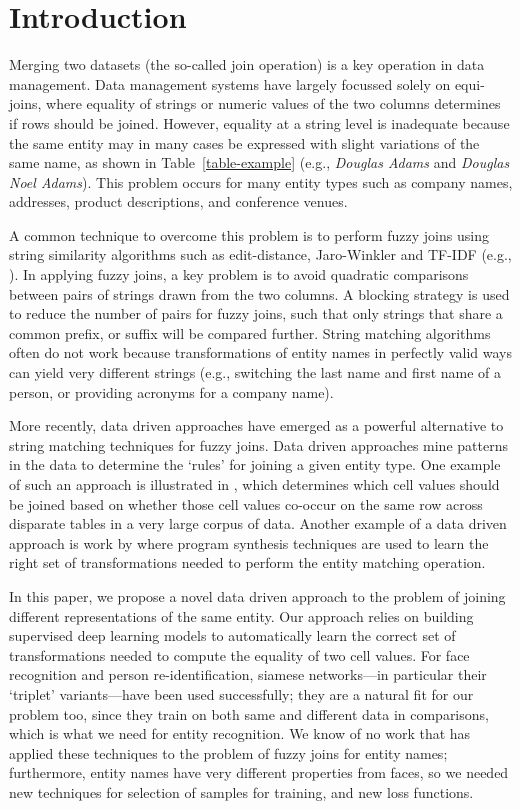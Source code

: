 \section{Introduction}

Merging two datasets (the so-called join operation) is a key operation in data management.  Data management systems have largely focussed solely on equi-joins, where equality of strings or numeric values of the two columns determines if rows should be joined.  However, equality at a string level is inadequate because the same entity may in many cases be expressed with slight variations of the same name, as shown in Table~\ref{table-example} (e.g., \textit{Douglas Adams} and \textit{Douglas Noel Adams}).  This problem occurs for many entity types such as company names, addresses, product descriptions, and conference venues.

A common technique to overcome this problem is to perform fuzzy joins using string similarity algorithms such as edit-distance, Jaro-Winkler and TF-IDF (e.g., \cite{Cohen2003}).  In applying fuzzy joins, a key problem is to avoid quadratic comparisons between pairs of strings drawn from the two columns.  A blocking strategy is used to reduce the number of pairs for fuzzy joins, such that only strings that share a common prefix, or suffix will be compared further.  String matching algorithms often do not work because transformations of entity names in perfectly valid ways can yield very different strings (e.g., switching the last name and first name of a person, or providing acronyms for a company name).

More recently, data driven approaches have emerged as a powerful alternative to string matching techniques for fuzzy joins.  Data driven approaches mine patterns in the data to determine the `rules' for joining a given entity type.  One example of such an approach is illustrated in \cite{He:2015:SJS:2824032.2824036}, which determines which cell values should be joined based on whether those cell values co-occur on the same row across disparate tables in a very large corpus of data.  Another example of a data driven approach is work by \cite{auto-join-joining-tables-leveraging-transformations} where program synthesis techniques are used to learn the right set of transformations needed to perform the entity matching operation.  

In this paper, we propose a novel data driven approach to the problem of joining different representations of the same entity.  Our approach relies on building supervised deep learning models to automatically learn the correct set of transformations needed to compute the equality of two cell values.  For face recognition and person re-identification, siamese networks---in particular their `triplet' variants---have been used successfully; they are a natural fit for our problem too, since they train on both same and different data in comparisons, which is what we need for entity recognition.  We know of no work that has applied these techniques to the problem of fuzzy joins for entity names; furthermore, entity names have very different properties from faces, so we needed new techniques for selection of samples for training, and new loss functions.

